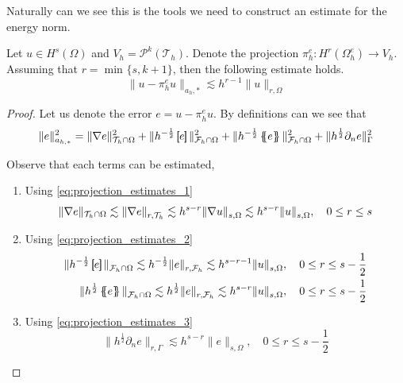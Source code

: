 
Naturally can we see this is the tools we need to construct an estimate for the energy norm.

\begin{corollary}
    \label{cor:projection_error_estimate}
    Let $u \in H^{s}( \Omega ) $ and $V_{h} = \mathcal{P} ^{k}( \mathcal{T} _{h})  $. Denote the projection $\pi ^{e}_{h}: H^{r}( \Omega ^{e} _{h}) \to V_{h}$. Assuming that $r = \min_{} \{ s, k+1\} $, then the following estimate holds. \[
    \| u - \pi ^{e}_{h}u \|_{a_{h},*}^{  } \lesssim h^{r-1} \| u \|_{ r, \Omega  }^{  }
    \]
\end{corollary}

\begin{proof}
    Let us denote the error $e = u - \pi _{h}^{e} u$. By definitions can we see that \[
    \| e \|_{ a_{h,*} }^{ 2 } = \| \nabla e \|_{\mathcal{T}_{h} \cap \Omega }   ^{  2} + \| h^{-\frac{1}{2}}  \jump{ e }   \|_{ \mathcal{F}_{h} \cap  \Omega   }^{  2}
    +   \|h^{-\frac{1}{2}} \mean{ e }    \|_{ \mathcal{F} _{h} \cap \Omega   }^{  2} + \| h^{\frac{1}{2}} \partial _{n} e \|_{ \Gamma   }^{2  }
    \]

    Observe that each terms can be estimated,
    \begin{enumerate}[label=\arabic*)]
        \item Using \eqref{eq:projection_estimates_1} \[
    \| \nabla e \|_{\mathcal{T}_{h} \cap \Omega } \lesssim \| \nabla  e \|_{r, \mathcal{T} _{h} }^{  }  \lesssim h^{s-r} \| \nabla  u \|_{ s, \Omega  }^{  } \lesssim h^{s-r} \|  u \|_{ s, \Omega  }^{  } , \quad 0\le r\le s \\
        \]
        \item Using \eqref{eq:projection_estimates_2} \[
                \begin{split}
\| h^{-\frac{1}{2}}  \jump{ e }   \|_{ \mathcal{F}_{h} \cap  \Omega   }^{  } \lesssim  h^{-\frac{1}{2}} \| e \|_{ r, \mathcal{F} _{h} }^{  }  \lesssim h^{s-r-1} \| u \|_{ s, \Omega  }^{  }, \quad 0  \le  r \le   s- \frac{1}{2} \\
\| h^{\frac{1}{2}}  \mean{ e }   \|_{ \mathcal{F}_{h} \cap  \Omega   }^{  } \lesssim  h^{\frac{1}{2}} \| e \|_{ r, \mathcal{F} _{h} }^{  }  \lesssim h^{s-r} \| u \|_{ s, \Omega  }^{  }, \quad 0  \le  r \le   s- \frac{1}{2} \\
                \end{split}
        \]
        \item Using \eqref{eq:projection_estimates_3} \[
\| h^{\frac{1}{2}} \partial _{n}e \|_{ r, \Gamma }^{  }  \lesssim h^{s-r} \| e \|_{ s, \Omega  }^{  }, \quad 0  \le  r \le   s- \frac{1}{2}
        \]
    \end{enumerate}

\end{proof}

